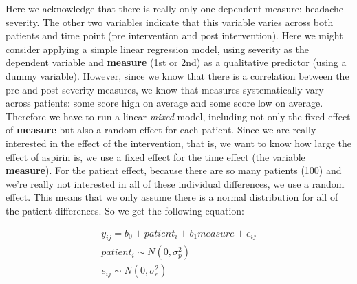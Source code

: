 \documentclass[]{report}\usepackage[]{graphicx}\usepackage[]{color}
\begin{document}
Here we acknowledge that there is really only one dependent measure: headache severity. The other two variables indicate that this variable varies across both patients and time point (pre intervention and post intervention). Here we might consider applying a simple linear regression model, using severity as the dependent variable and \textbf{measure} (1st or 2nd) as a qualitative predictor (using a dummy variable). However, since we know that there is a correlation between the pre and post severity measures, we know that measures systematically vary across patients: some score high on average and some score low on average. Therefore we have to run a linear \textit{mixed} model, including not only the fixed effect of \textbf{measure} but also a random effect for each patient. Since we are really interested in the effect of the intervention, that is, we want to know how large the effect of aspirin is, we use a fixed effect for the time effect (the variable \textbf{measure}). For the patient effect, because there are so many patients (100) and we're really not interested in all of these individual differences, we use a random effect. This means that we only assume there is a normal distribution for all of the patient differences. So we get the following equation:


\begin{eqnarray}
y_{ij} = b_0 + patient_i + b_1 measure + e_{ij} \\
patient_i \sim N(0, \sigma_p^2)\\
e_{ij} \sim N(0, \sigma_e^2)
\end{eqnarray}
\end{document}
